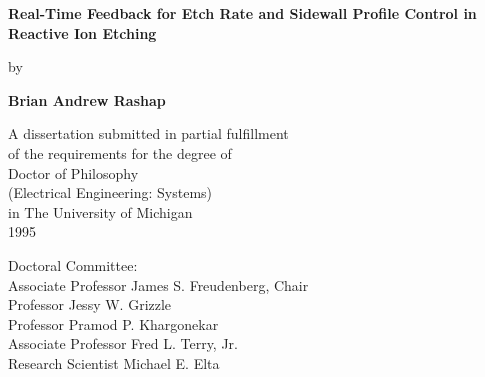 \begin{titlepage}
	
	\begin{center}
		
		\vspace*{1cm}
		
		\textbf{Real-Time Feedback for Etch Rate and Sidewall Profile
			Control in Reactive Ion Etching}
		
		
		\vspace{3cm}
		
		by
		
		\vspace{0.5cm}
		
		\textbf{Brian Andrew Rashap}
		
		\vfill
		
		A dissertation submitted in partial fulfillment\\
		of the requirements for the degree of\\
		Doctor of Philosophy\\
		(Electrical Engineering: Systems)\\
		in The University of Michigan\\
		1995
		\\
		
		\vspace{0.8cm}
		
	\end{center}
	
	Doctoral Committee:\\
	\tab Associate Professor James S. Freudenberg, Chair\\
	\tab Professor Jessy W. Grizzle\\
	\tab Professor Pramod P. Khargonekar\\
	\tab Associate Professor Fred L. Terry, Jr.\\
	\tab Research Scientist Michael E. Elta\\
	
	\thispagestyle{empty}
\end{titlepage}
